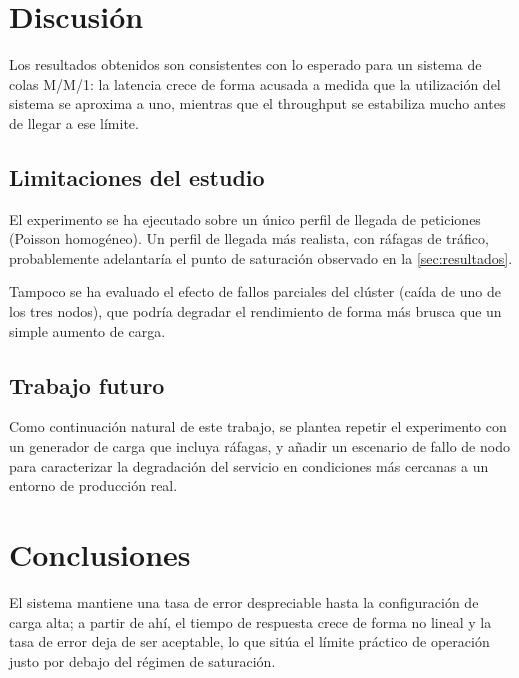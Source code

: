 \documentclass[11pt,twoside]{article}
\begin{document}
\section{Discusión}
\label{sec:discusion}

Los resultados obtenidos son consistentes con lo esperado para un sistema
de colas M/M/1: la latencia crece de forma acusada a medida que la
utilización del sistema se aproxima a uno, mientras que el throughput se
estabiliza mucho antes de llegar a ese límite.

\subsection{Limitaciones del estudio}

El experimento se ha ejecutado sobre un único perfil de llegada de
peticiones (Poisson homogéneo). Un perfil de llegada más realista, con
ráfagas de tráfico, probablemente adelantaría el punto de saturación
observado en la \autoref{sec:resultados}.

Tampoco se ha evaluado el efecto de fallos parciales del clúster (caída de
uno de los tres nodos), que podría degradar el rendimiento de forma más
brusca que un simple aumento de carga.

\subsection{Trabajo futuro}

Como continuación natural de este trabajo, se plantea repetir el
experimento con un generador de carga que incluya ráfagas, y añadir un
escenario de fallo de nodo para caracterizar la degradación del servicio
en condiciones más cercanas a un entorno de producción real.

\section{Conclusiones}
\label{sec:conclusiones}

El sistema mantiene una tasa de error despreciable hasta la configuración
de carga alta; a partir de ahí, el tiempo de respuesta crece de forma no
lineal y la tasa de error deja de ser aceptable, lo que sitúa el límite
práctico de operación justo por debajo del régimen de saturación.
\end{document}

